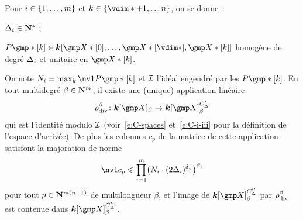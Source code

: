 \begin{lem}
  Pour \( i \in \{ 1, \dots, m \} \) et \( \ind \in \{ \vdim* + 1,
  \dots \dimp \} \), on se donne :
  \begin{enumthm}
    \item \( \Delta_i \in {\mathbf{N}}^* \) ;
    \item \( P\mexp*[\ind]
      \in
      \cdn [ \vmp*[0], \dots, \vmp*[\vdim*], \vmp*[\ind] ] \)
      homogène de degré \( \Delta_i \) et unitaire en \( \vmp*[\ind]
      \).
  \end{enumthm}
  On note \( N_\fct = \max_\ind \nv1 { P\mexp*[\ind] } \) et \( \mathcal I \)
  l'idéal engendré par les \( P\mexp*[\ind] \). En tout multidegré
  \( \beta \in {\mathbf{N}}^m \), il existe une (unique) application linéaire
  \begin{equation}
    \rdiv^\beta \colon \cdn [\vmp]_ \beta \to \cdn [\vmp]_ \beta^{C'_\Delta}
  \end{equation}
  qui est l'identité modulo \( \mathcal I \) (voir~\eqref{e:C-spaces}
  et~\eqref{e:C-i-iii} pour la définition de l'espace d'arrivée). De plus les
  colonnes \( c_p \) de la matrice de cette application satisfont la majoration
  de norme
  \begin{equation}
    \nv1{c_p}
    \le
    \prod\fctrange \bigl(
    N_\fct \cdot (2 \Delta_\fct)^\dv
    \bigr) ^{\beta_\fct}
  \end{equation}
  pour tout \( p \in {\mathbf{N}}^{m(n+1)} \) de multilongueur \( \beta \), et
  l'image de \( \cdn [\vmp]_ \beta ^{C''_\Delta} \) par \( \rho\sb{\mathrm{div }}^\beta \) est
  contenue dans \( \cdn [\vmp]_ \beta ^{C'''_\Delta} \).
\end{lem}

